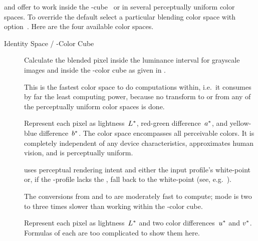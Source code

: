  and  offer to work inside
the -cube~ or in several
perceptually uniform color spaces.  To override the default select a
particular blending color space with
option~.
Here are the four available color spaces.

\begin{description}
\item[Identity Space / -Color Cube]\itemend Calculate
  the blended pixel inside the luminance interval
   for grayscale images and inside
  the -color cube%
   as
  given in .

  This is the fastest color space to do computations within, i.e.\ it
  consumes by far the least computing power, because no transform to
  or from any of the perceptually uniform color spaces is done.

\item[]\itemend\urltext
  Represent each pixel as lightness~$L\mbox{${}^{*}$}$, red-green
  difference~$a\mbox{${}^{*}$}$, and yellow-blue
  difference~$b\mbox{${}^{*}$}$.  The  color
  space%
  encompasses all perceivable colors.  It is completely independent of
  any device characteristics, approximates human vision, and is
  perceptually uniform.

  \App{} uses perceptual rendering intent and either the input
  profile's white-point or, if the -profile lacks the
  , fall back to the
  white-point (see, e.g.\ ).

  The conversions from and to  are moderately fast to
  compute;  mode is two to three times slower than
  working within the -color cube.

\item[]\itemend\urltext
  Represent each pixel as lightness~$L\mbox{${}^{*}$}$ and two color
  differences~$u\mbox{${}^{*}$}$ and $v\mbox{${}^{*}$}$.  Formulas of
  each are too complicated to show them here.


\end{description}
